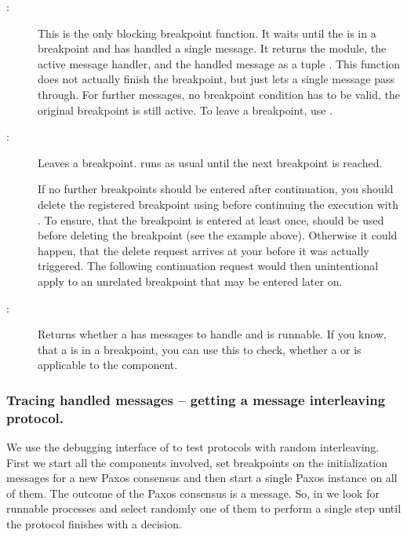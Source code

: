 \begin{description}
\item[:] This is the only blocking
  breakpoint function. It waits until the  is in a
  breakpoint and has handled a single message.  It returns the module, the
  active message handler, and the handled message as a tuple .  This function does not actually finish the breakpoint,
  but just lets a single message pass through. For further messages, no
  breakpoint condition has to be valid, the original breakpoint is still
  active. To leave a breakpoint, use .

\item[:]
  Leaves a breakpoint.  runs as usual until the
  next breakpoint is reached.

  If no further breakpoints should be entered after continuation, you should
  delete the registered breakpoint using 
  before continuing the execution with
  . To ensure, that the breakpoint is
  entered at least once,  should be
  used before deleting the breakpoint (see the example above). Otherwise it
  could happen, that the delete request arrives at your
   before it was actually triggered. The following
  continuation request would then unintentional apply to an unrelated
  breakpoint that may be entered later on.

\item[:] Returns whether a
   has messages to handle and is runnable. If you
  know, that a  is in a breakpoint, you can use
  this to check, whether a  or
   is applicable to the component.

\end{description}

\subsubsection{Tracing handled messages -- getting a message  interleaving protocol.}

We use the debugging interface of  to test
protocols with random interleaving. First we start all the components
involved, set breakpoints on the initialization messages for a new Paxos
consensus and then start a single Paxos instance on all of them. The outcome
of the Paxos consensus is a  message. So, in
 we look for runnable processes
and select randomly one of them to perform a single step until the protocol
finishes with a decision.

